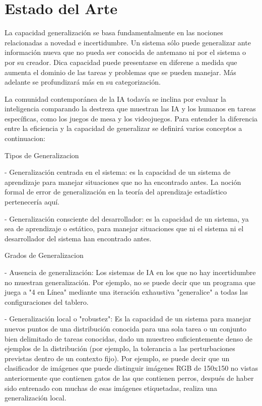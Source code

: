 \chapter{Estado del Arte}\label{chapter:state-of-the-art}
La capacidad generalización se basa fundamentalmente en las nociones relacionadas a novedad e incertidumbre. Un sistema sólo puede generalizar ante información nueva que no pueda ser conocida de antemano ni por el sistema o por su creador. Dica capacidad puede presentarse en diferene a medida que aumenta el dominio de las tareas y problemas que se pueden manejar. Más adelante se profundizará más en su categorización.

La comunidad contemporánea de la IA todavía se inclina por evaluar la inteligencia comparando la destreza que muestran las IA y los humanos en tareas específicas, como los juegos de mesa y los videojuegos. Para entender la diferencia entre la eficiencia y la capacidad de generalizar se definirá varios conceptos a continuacion:

Tipos de Generalizacion

- Generalización centrada en el sistema: es la capacidad de un sistema de aprendizaje para manejar situaciones que no ha encontrado antes. La noción formal de error de generalización en la teoría del aprendizaje estadístico pertenecería aquí.

- Generalización consciente del desarrollador: es la capacidad de un sistema, ya sea de aprendizaje o estático, para manejar situaciones que ni el sistema ni el desarrollador del sistema han encontrado antes.

Grados de Generalizacion

- Ausencia de generalización: Los sistemas de IA en los que no hay incertidumbre no muestran generalización. Por ejemplo, no se puede decir que un programa que juega a "4 en Línea" mediante una iteración exhaustiva "generalice" a todas las configuraciones del tablero.

- Generalización local o "robustez": Es la capacidad de un sistema para manejar nuevos puntos de una distribución conocida para una sola tarea o un conjunto bien delimitado de tareas conocidas, dado un muestreo suficientemente denso de ejemplos de la distribución (por ejemplo, la tolerancia a las perturbaciones previstas dentro de un contexto fijo). Por ejemplo, se puede decir que un clasificador de imágenes que puede distinguir imágenes RGB de 150x150 no vistas anteriormente que contienen gatos de las que contienen perros, después de haber sido entrenado con muchas de esas imágenes etiquetadas, realiza una generalización local. 

